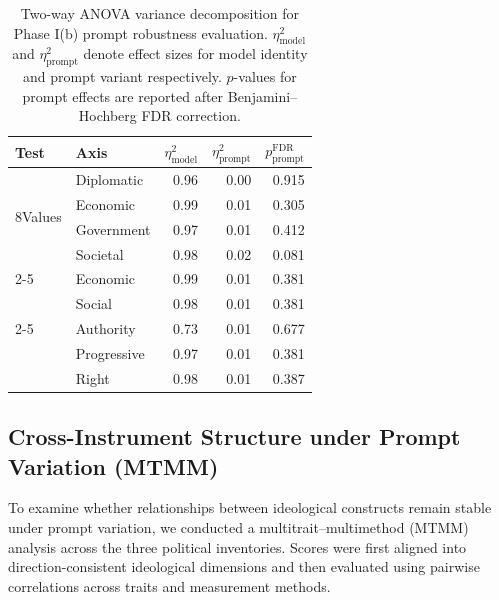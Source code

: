 \documentclass[11pt]{article}
\begin{document}
\begin{table}[t]
\centering
\small
\setlength{\tabcolsep}{4pt} %
\begin{tabular}{l l r r r}
\toprule
\textbf{Test} & \textbf{Axis} & $\eta^2_{\text{model}}$ & $\eta^2_{\text{prompt}}$ & $p_{\text{prompt}}^{\text{FDR}}$ \\
\midrule
\multirow{4}{*}{8Values}      & Diplomatic  & 0.96 & 0.00 & 0.915 \\
                              & Economic    & 0.99 & 0.01 & 0.305 \\
                              & Government  & 0.97 & 0.01 & 0.412 \\
                              & Societal    & 0.98 & 0.02 & 0.081 \\
\cmidrule{2-5}
\multirow{2}{*}{PCT}          & Economic    & 0.99 & 0.01 & 0.381 \\
                              & Social      & 0.98 & 0.01 & 0.381 \\
\cmidrule{2-5}
\multirow{3}{*}{SapplyValues} & Authority   & 0.73 & 0.01 & 0.677 \\
                              & Progressive & 0.97 & 0.01 & 0.381 \\
                              & Right       & 0.98 & 0.01 & 0.387 \\
\bottomrule
\end{tabular}
\caption{Two-way ANOVA variance decomposition for Phase I(b) prompt robustness evaluation. $\eta^2_{\text{model}}$ and $\eta^2_{\text{prompt}}$ denote effect sizes for model identity and prompt variant respectively. $p$-values for prompt effects are reported after Benjamini–Hochberg FDR correction.}
\label{tab:anova_prompt}
\end{table}




\subsection{Cross-Instrument Structure under Prompt Variation (MTMM)}
\label{app:phaseib-mtmm}

To examine whether relationships between ideological constructs remain stable
under prompt variation, we conducted a multitrait–multimethod (MTMM) analysis
across the three political inventories. Scores were first aligned into
direction-consistent ideological dimensions and then evaluated using pairwise
correlations across traits and measurement methods.
\end{document}
